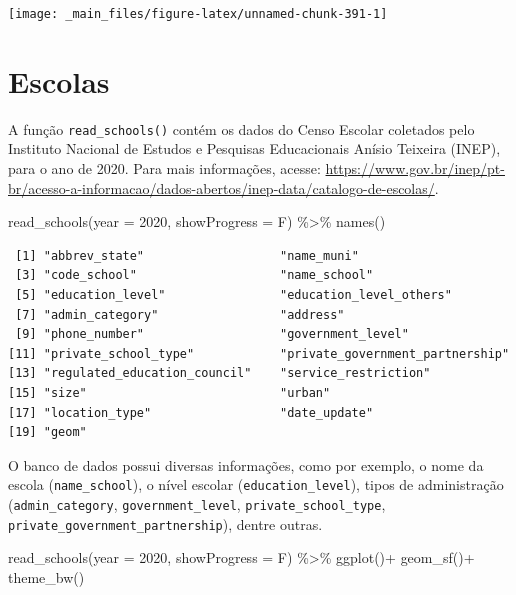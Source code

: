 \documentclass[
  brazilian,
]{book}
\newenvironment{Shaded}{\begin{snugshade}}{\end{snugshade}}
\newcommand{\AttributeTok}[1]{\textcolor[rgb]{0.77,0.63,0.00}{#1}}
\newcommand{\DecValTok}[1]{\textcolor[rgb]{0.00,0.00,0.81}{#1}}
\newcommand{\FunctionTok}[1]{\textcolor[rgb]{0.00,0.00,0.00}{#1}}
\newcommand{\NormalTok}[1]{#1}
\newcommand{\SpecialCharTok}[1]{\textcolor[rgb]{0.00,0.00,0.00}{#1}}
\begin{document}
\begin{center}\texttt{[image: \_main\_files/figure-latex/unnamed-chunk-391-1]} \end{center}

\hypertarget{escolas}{%
\section{Escolas}\label{escolas}}

A função \texttt{read\_schools()} contém os dados do Censo Escolar coletados pelo Instituto Nacional de Estudos e Pesquisas Educacionais Anísio Teixeira (INEP), para o ano de 2020. Para mais informações, acesse: \url{https://www.gov.br/inep/pt-br/acesso-a-informacao/dados-abertos/inep-data/catalogo-de-escolas/}.

\begin{Shaded}
\begin{Highlighting}[]
\FunctionTok{read\_schools}\NormalTok{(}\AttributeTok{year =} \DecValTok{2020}\NormalTok{,}
             \AttributeTok{showProgress =}\NormalTok{ F) }\SpecialCharTok{\%\textgreater{}\%} \FunctionTok{names}\NormalTok{()}
\end{Highlighting}
\end{Shaded}

\begin{verbatim}
 [1] "abbrev_state"                   "name_muni"                     
 [3] "code_school"                    "name_school"                   
 [5] "education_level"                "education_level_others"        
 [7] "admin_category"                 "address"                       
 [9] "phone_number"                   "government_level"              
[11] "private_school_type"            "private_government_partnership"
[13] "regulated_education_council"    "service_restriction"           
[15] "size"                           "urban"                         
[17] "location_type"                  "date_update"                   
[19] "geom"                          
\end{verbatim}

O banco de dados possui diversas informações, como por exemplo, o nome da escola (\texttt{name\_school}), o nível escolar (\texttt{education\_level}), tipos de administração (\texttt{admin\_category}, \texttt{government\_level}, \texttt{private\_school\_type}, \texttt{private\_government\_partnership}), dentre outras.

\begin{Shaded}
\begin{Highlighting}[]
\FunctionTok{read\_schools}\NormalTok{(}\AttributeTok{year =} \DecValTok{2020}\NormalTok{,}
             \AttributeTok{showProgress =}\NormalTok{ F) }\SpecialCharTok{\%\textgreater{}\%}
  \FunctionTok{ggplot}\NormalTok{()}\SpecialCharTok{+}
  \FunctionTok{geom\_sf}\NormalTok{()}\SpecialCharTok{+}
  \FunctionTok{theme\_bw}\NormalTok{()}
\end{Highlighting}
\end{Shaded}
\end{document}
